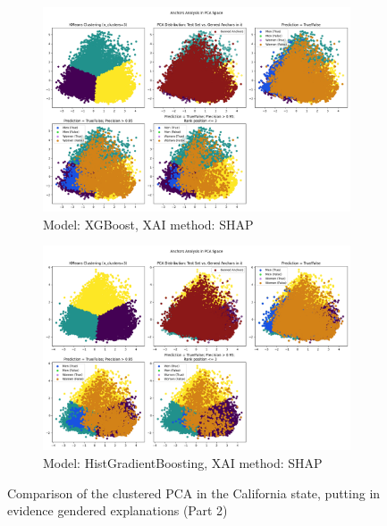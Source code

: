 \begin{figure}[h]
    \ContinuedFloat
    \begin{subfigure}[b]{1.0\textwidth}
        \includegraphics[width=\textwidth]{Images/clustered_pca/clusters_xg_ca_shap.png}
        \caption{Model: XGBoost, XAI method: SHAP}
        \label{fig:clusters_xg_ca_shap}
    \end{subfigure}

    \begin{subfigure}[b]{1.0\textwidth}
        \includegraphics[width=\textwidth]{Images/clustered_pca/clusters_skrub_ca_shap.png}
        \caption{Model: HistGradientBoosting, XAI method: SHAP}
        \label{fig:clusters_skrub_ca_shap}
    \end{subfigure}

    \caption{Comparison of the clustered PCA in the California state, putting in evidence gendered explanations (Part 2)}
    \label{fig:clusters_ca}
\end{figure}

